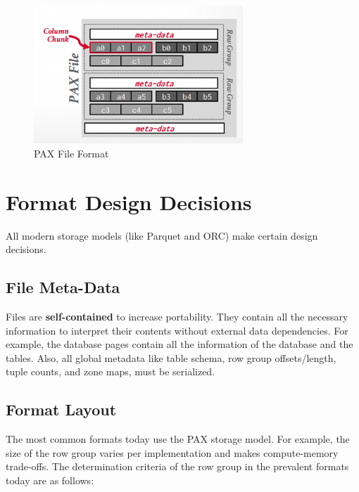 \documentclass[11pt]{article}
\begin{document}
\begin{figure}[htbp]
    \centering
    \includegraphics[width=0.7\textwidth]{fig/pax-file.pdf}
    \caption{PAX File Format}
    \label{fig:pax-file}
\end{figure}

\section{Format Design Decisions}

All modern storage models (like Parquet and ORC) make certain design decisions.

\subsection*{File Meta-Data}

Files are \textbf{self-contained} to increase portability. They contain all the necessary information to interpret their contents without external data dependencies. For example, the database pages contain all the information of the database and the tables. Also, all global metadata like table schema, row group offsets/length, tuple counts, and zone maps, must be serialized.

\subsection*{Format Layout}

The most common formats today use the PAX storage model. For example, the size of the row group varies per implementation and makes compute-memory trade-offs. The determination criteria of the row group in the prevalent formats today are as follows:
\end{document}

